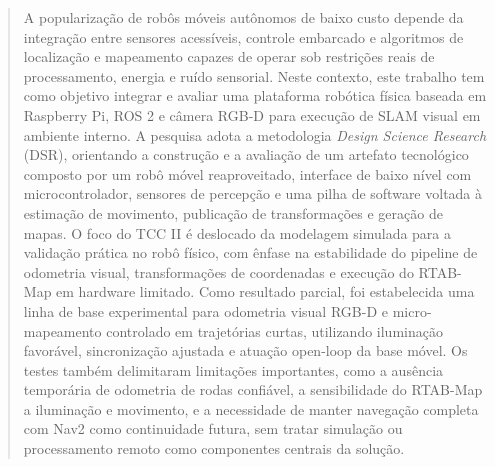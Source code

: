 %
%

\begin{abstract}
A popularização de robôs móveis autônomos de baixo custo depende da integração entre sensores acessíveis, controle embarcado e algoritmos de localização e mapeamento capazes de operar sob restrições reais de processamento, energia e ruído sensorial. Neste contexto, este trabalho tem como objetivo integrar e avaliar uma plataforma robótica física baseada em Raspberry Pi, ROS 2 e câmera RGB-D para execução de SLAM visual em ambiente interno. A pesquisa adota a metodologia \emph{Design Science Research} (DSR), orientando a construção e a avaliação de um artefato tecnológico composto por um robô móvel reaproveitado, interface de baixo nível com microcontrolador, sensores de percepção e uma pilha de software voltada à estimação de movimento, publicação de transformações e geração de mapas. O foco do TCC II é deslocado da modelagem simulada para a validação prática no robô físico, com ênfase na estabilidade do pipeline de odometria visual, transformações de coordenadas e execução do RTAB-Map em hardware limitado. Como resultado parcial, foi estabelecida uma linha de base experimental para odometria visual RGB-D e micro-mapeamento controlado em trajetórias curtas, utilizando iluminação favorável, sincronização ajustada e atuação open-loop da base móvel. Os testes também delimitaram limitações importantes, como a ausência temporária de odometria de rodas confiável, a sensibilidade do RTAB-Map a iluminação e movimento, e a necessidade de manter navegação completa com Nav2 como continuidade futura, sem tratar simulação ou processamento remoto como componentes centrais da solução.
\end{abstract}

%
%

